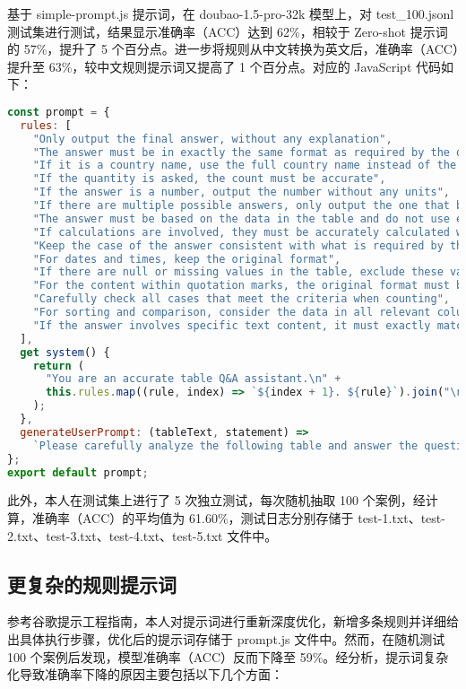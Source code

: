\documentclass[12pt,a4paper]{ctexart}
\begin{document}
基于 simple-prompt.js 提示词，在 doubao-1.5-pro-32k 模型上，对 test\_100.jsonl 测试集进行测试，结果显示准确率（ACC）达到 62\%，相较于 Zero-shot 提示词的 57\%，提升了 5 个百分点。进一步将规则从中文转换为英文后，准确率（ACC）提升至 63\%，较中文规则提示词又提高了 1 个百分点。对应的 JavaScript 代码如下：

\begin{lstlisting}[language=JavaScript]
const prompt = {
  rules: [
    "Only output the final answer, without any explanation",
    "The answer must be in exactly the same format as required by the question",
    "If it is a country name, use the full country name instead of the abbreviation",
    "If the quantity is asked, the count must be accurate",
    "If the answer is a number, output the number without any units",
    "If there are multiple possible answers, only output the one that best meets the requirements of the question",
    "The answer must be based on the data in the table and do not use external knowledge",
    "If calculations are involved, they must be accurately calculated without estimation",
    "Keep the case of the answer consistent with what is required by the question",
    "For dates and times, keep the original format",
    "If there are null or missing values in the table, exclude these values during calculations",
    "For the content within quotation marks, the original format must be maintained, including the quotation marks themselves",
    "Carefully check all cases that meet the criteria when counting",
    "For sorting and comparison, consider the data in all relevant columns",
    "If the answer involves specific text content, it must exactly match the original text, including case and punctuation marks",
  ],
  get system() {
    return (
      "You are an accurate table Q&A assistant.\n" +
      this.rules.map((rule, index) => `${index + 1}. ${rule}`).join("\n")
    );
  },
  generateUserPrompt: (tableText, statement) =>
    `Please carefully analyze the following table and answer the questions accurately. Note: Only output the answers, do not explain the process.\n\nTable Content: ${tableText}\n\nQuestion：${statement}\n\nPlease give the answer directly.`,
};
export default prompt;
\end{lstlisting}

此外，本人在测试集上进行了 5 次独立测试，每次随机抽取 100 个案例，经计算，准确率（ACC）的平均值为 61.60\%，测试日志分别存储于 test-1.txt、test-2.txt、test-3.txt、test-4.txt、test-5.txt 文件中。

\subsection{更复杂的规则提示词}
参考谷歌提示工程指南，本人对提示词进行重新深度优化，新增多条规则并详细给出具体执行步骤，优化后的提示词存储于 prompt.js 文件中。然而，在随机测试 100 个案例后发现，模型准确率（ACC）反而下降至 59\%。经分析，提示词复杂化导致准确率下降的原因主要包括以下几个方面：
\end{document}
